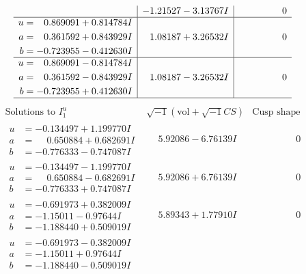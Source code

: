 \documentclass[1p]{elsarticle_modified}
\theoremstyle{definition}
\newcommand{\I}{\sqrt{-1}}
\begin{document}
$$\begin{array}{c|c|c}
 & -1.21527 - 3.13767 I & \phantom{-0.000000 } 0 \\ \hline\begin{aligned}
u &= \phantom{-}0.869091 + 0.814784 I \\
a &= \phantom{-}0.361592 + 0.843929 I \\
b &= -0.723955 - 0.412630 I\end{aligned}
 & \phantom{-}1.08187 + 3.26532 I & \phantom{-0.000000 } 0 \\ \hline\begin{aligned}
u &= \phantom{-}0.869091 - 0.814784 I \\
a &= \phantom{-}0.361592 - 0.843929 I \\
b &= -0.723955 + 0.412630 I\end{aligned}
 & \phantom{-}1.08187 - 3.26532 I & \phantom{-0.000000 } 0\\
 \hline 
 \end{array}$$\newpage$$\begin{array}{c|c|c}  
\text{Solutions to }I^u_{1}& \I (\text{vol} + \sqrt{-1}CS) & \text{Cusp shape}\\
 \hline 
\begin{aligned}
u &= -0.134497 + 1.199770 I \\
a &= \phantom{-}0.650884 + 0.682691 I \\
b &= -0.776333 - 0.747087 I\end{aligned}
 & \phantom{-}5.92086 - 6.76139 I & \phantom{-0.000000 } 0 \\ \hline\begin{aligned}
u &= -0.134497 - 1.199770 I \\
a &= \phantom{-}0.650884 - 0.682691 I \\
b &= -0.776333 + 0.747087 I\end{aligned}
 & \phantom{-}5.92086 + 6.76139 I & \phantom{-0.000000 } 0 \\ \hline\begin{aligned}
u &= -0.691973 + 0.382009 I \\
a &= -1.15011 - 0.97644 I \\
b &= -1.188440 + 0.509019 I\end{aligned}
 & \phantom{-}5.89343 + 1.77910 I & \phantom{-0.000000 } 0 \\ \hline\begin{aligned}
u &= -0.691973 - 0.382009 I \\
a &= -1.15011 + 0.97644 I \\
b &= -1.188440 - 0.509019 I\end{aligned}

\end{array}$$
\end{document}
